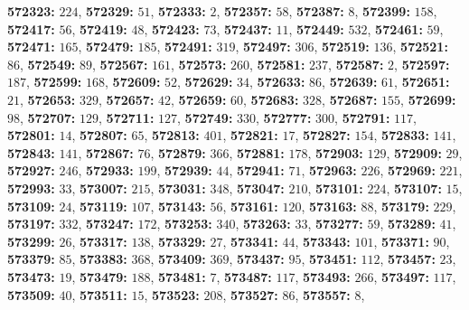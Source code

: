 \textsf{\bfseries 572323:} $224$, \textsf{\bfseries 572329:} $51$, \textsf{\bfseries 572333:} $2$, \textsf{\bfseries 572357:} $58$, \textsf{\bfseries 572387:} $8$, \textsf{\bfseries 572399:} $158$, \textsf{\bfseries 572417:} $56$, \textsf{\bfseries 572419:} $48$, \textsf{\bfseries 572423:} $73$, \textsf{\bfseries 572437:} $11$, \textsf{\bfseries 572449:} $532$, \textsf{\bfseries 572461:} $59$, \textsf{\bfseries 572471:} $165$, \textsf{\bfseries 572479:} $185$, \textsf{\bfseries 572491:} $319$, \textsf{\bfseries 572497:} $306$, \textsf{\bfseries 572519:} $136$, \textsf{\bfseries 572521:} $86$, \textsf{\bfseries 572549:} $89$, \textsf{\bfseries 572567:} $161$, \textsf{\bfseries 572573:} $260$, \textsf{\bfseries 572581:} $237$, \textsf{\bfseries 572587:} $2$, \textsf{\bfseries 572597:} $187$, \textsf{\bfseries 572599:} $168$, \textsf{\bfseries 572609:} $52$, \textsf{\bfseries 572629:} $34$, \textsf{\bfseries 572633:} $86$, \textsf{\bfseries 572639:} $61$, \textsf{\bfseries 572651:} $21$, \textsf{\bfseries 572653:} $329$, \textsf{\bfseries 572657:} $42$, \textsf{\bfseries 572659:} $60$, \textsf{\bfseries 572683:} $328$, \textsf{\bfseries 572687:} $155$, \textsf{\bfseries 572699:} $98$, \textsf{\bfseries 572707:} $129$, \textsf{\bfseries 572711:} $127$, \textsf{\bfseries 572749:} $330$, \textsf{\bfseries 572777:} $300$, \textsf{\bfseries 572791:} $117$, \textsf{\bfseries 572801:} $14$, \textsf{\bfseries 572807:} $65$, \textsf{\bfseries 572813:} $401$, \textsf{\bfseries 572821:} $17$, \textsf{\bfseries 572827:} $154$, \textsf{\bfseries 572833:} $141$, \textsf{\bfseries 572843:} $141$, \textsf{\bfseries 572867:} $76$, \textsf{\bfseries 572879:} $366$, \textsf{\bfseries 572881:} $178$, \textsf{\bfseries 572903:} $129$, \textsf{\bfseries 572909:} $29$, \textsf{\bfseries 572927:} $246$, \textsf{\bfseries 572933:} $199$, \textsf{\bfseries 572939:} $44$, \textsf{\bfseries 572941:} $71$, \textsf{\bfseries 572963:} $226$, \textsf{\bfseries 572969:} $221$, \textsf{\bfseries 572993:} $33$, \textsf{\bfseries 573007:} $215$, \textsf{\bfseries 573031:} $348$, \textsf{\bfseries 573047:} $210$, \textsf{\bfseries 573101:} $224$, \textsf{\bfseries 573107:} $15$, \textsf{\bfseries 573109:} $24$, \textsf{\bfseries 573119:} $107$, \textsf{\bfseries 573143:} $56$, \textsf{\bfseries 573161:} $120$, \textsf{\bfseries 573163:} $88$, \textsf{\bfseries 573179:} $229$, \textsf{\bfseries 573197:} $332$, \textsf{\bfseries 573247:} $172$, \textsf{\bfseries 573253:} $340$, \textsf{\bfseries 573263:} $33$, \textsf{\bfseries 573277:} $59$, \textsf{\bfseries 573289:} $41$, \textsf{\bfseries 573299:} $26$, \textsf{\bfseries 573317:} $138$, \textsf{\bfseries 573329:} $27$, \textsf{\bfseries 573341:} $44$, \textsf{\bfseries 573343:} $101$, \textsf{\bfseries 573371:} $90$, \textsf{\bfseries 573379:} $85$, \textsf{\bfseries 573383:} $368$, \textsf{\bfseries 573409:} $369$, \textsf{\bfseries 573437:} $95$, \textsf{\bfseries 573451:} $112$, \textsf{\bfseries 573457:} $23$, \textsf{\bfseries 573473:} $19$, \textsf{\bfseries 573479:} $188$, \textsf{\bfseries 573481:} $7$, \textsf{\bfseries 573487:} $117$, \textsf{\bfseries 573493:} $266$, \textsf{\bfseries 573497:} $117$, \textsf{\bfseries 573509:} $40$, \textsf{\bfseries 573511:} $15$, \textsf{\bfseries 573523:} $208$, \textsf{\bfseries 573527:} $86$, \textsf{\bfseries 573557:} $8$, 
